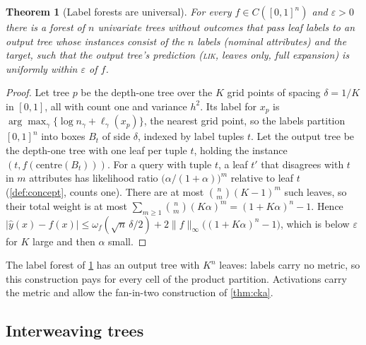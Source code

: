 \documentclass[11pt]{article}
\newtheorem{theorem}{Theorem}
\theoremstyle{definition}
\theoremstyle{remark}
\newcommand{\hy}{\hat{y}}
\begin{document}
\begin{theorem}[Label forests are universal]\label{thm:label}
For every $f\in C([0,1]^n)$ and $\varepsilon>0$ there is a forest of $n$ univariate trees
without outcomes that pass leaf labels to an output tree whose instances consist of the
$n$ labels (nominal attributes) and the target, such that the output tree's prediction
(\textsc{lik}, leaves only, full expansion) is uniformly within $\varepsilon$ of $f$.
\end{theorem}
\begin{proof}
Let tree $p$ be the depth-one tree over the $K$ grid points of spacing $\delta=1/K$ in
$[0,1]$, all with count one and variance $h^2$.  Its label for $x_p$ is
$\arg\max_\gamma\{\log n_\gamma+\ell_\gamma(x_p)\}$, the nearest grid point, so the
labels partition $[0,1]^n$ into boxes $B_t$ of side $\delta$, indexed by label tuples
$t$.  Let the output tree be the depth-one tree with one leaf per tuple $t$, holding the
instance $(t,f(\text{centre}(B_t)))$.  For a query with tuple $t$, a leaf $t'$ that
disagrees with $t$ in $m$ attributes has likelihood ratio $\bigl(\alpha/(1+\alpha)\bigr)^m$
relative to leaf $t$ (\cref{def:concept}, counts one).  There are at most
$\binom nm(K-1)^m$ such leaves, so their total weight is at most
$\sum_{m\ge1}\binom nm(K\alpha)^m=(1+K\alpha)^n-1$.  Hence
$|\hy(x)-f(x)|\le\omega_f(\sqrt n\,\delta/2)+2\|f\|_\infty\bigl((1+K\alpha)^n-1\bigr)$,
which is below $\varepsilon$ for $K$ large and then $\alpha$ small.
\end{proof}

The label forest of \cref{thm:label} has an output tree with $K^n$ leaves: labels carry
no metric, so this construction pays for every cell of the product partition.
Activations carry the metric and allow the fan-in-two construction of \cref{thm:cka}.

\subsection{Interweaving trees}
\end{document}
